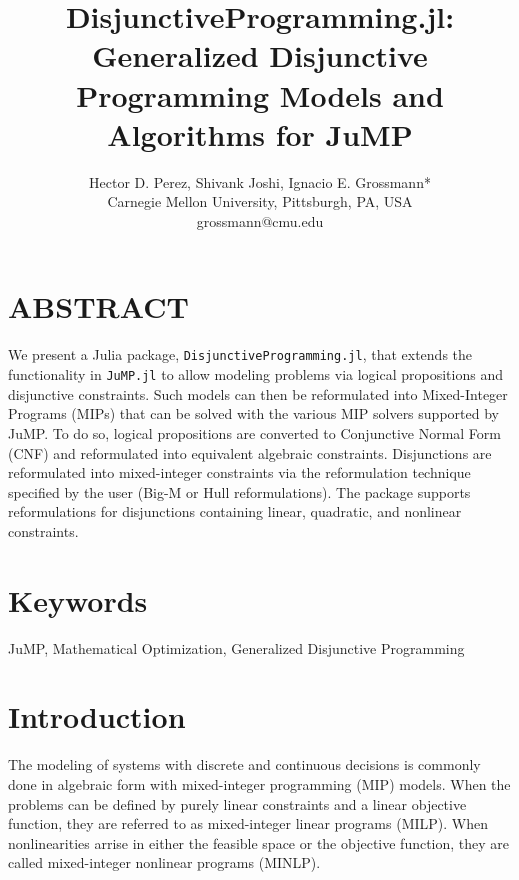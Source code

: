 \documentclass{juliacon}
\begin{document}
\title{DisjunctiveProgramming.jl: Generalized Disjunctive Programming Models and Algorithms for JuMP}
\author{
  \large Hector D. Perez, Shivank Joshi, Ignacio E. Grossmann*
  \\\normalsize Carnegie Mellon University, Pittsburgh, PA, USA
  \\\normalsize	*grossmann@cmu.edu
}

\maketitle

\section*{ABSTRACT}
We present a Julia package, \verb|DisjunctiveProgramming.jl|, that extends the functionality in \verb|JuMP.jl| to allow modeling problems via logical propositions and disjunctive constraints. Such models can then be reformulated into Mixed-Integer Programs (MIPs) that can be solved with the various MIP solvers supported by JuMP. To do so, logical propositions are converted to Conjunctive Normal Form (CNF) and reformulated into equivalent algebraic constraints. Disjunctions are reformulated into mixed-integer constraints via the reformulation technique specified by the user (Big-M or Hull reformulations). The package supports reformulations for disjunctions containing linear, quadratic, and nonlinear constraints.

\section*{Keywords}
JuMP, Mathematical Optimization, Generalized Disjunctive Programming

\section{Introduction}
The modeling of systems with discrete and continuous decisions is commonly done in algebraic form with mixed-integer programming (MIP) models. When the problems can be defined by purely linear constraints and a linear objective function, they are referred to as mixed-integer linear programs (MILP). When nonlinearities arrise in either the feasible space or the objective function, they are called mixed-integer nonlinear programs (MINLP).
\end{document}
